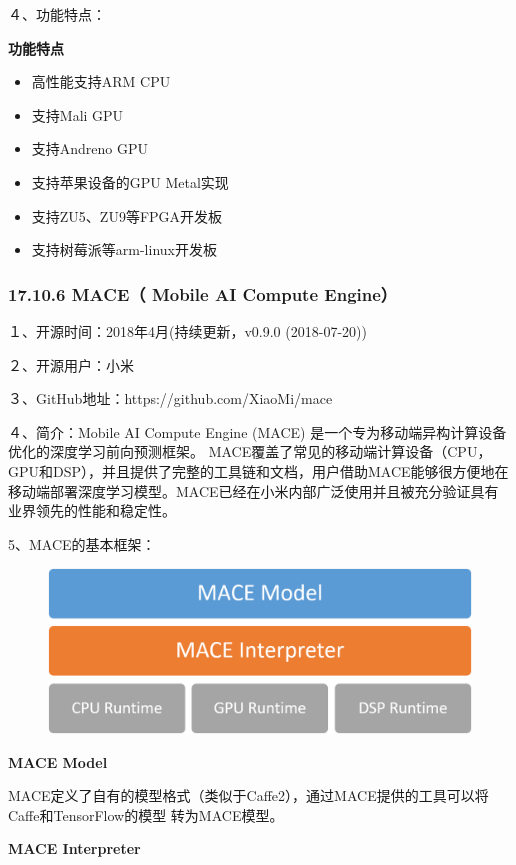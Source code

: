 ４、功能特点：

\textbf{功能特点}

\begin{itemize}
\item
  高性能支持ARM CPU
\item
  支持Mali GPU
\item
  支持Andreno GPU
\item
  支持苹果设备的GPU Metal实现
\item
  支持ZU5、ZU9等FPGA开发板
\item
  支持树莓派等arm-linux开发板
\end{itemize}

\subsubsection{17.10.6 MACE（ Mobile AI Compute
Engine）}\label{mace-mobile-ai-compute-engine}

１、开源时间：2018年4月(持续更新，v0.9.0 (2018-07-20))　　　

２、开源用户：小米　　　　

３、GitHub地址：https://github.com/XiaoMi/mace

４、简介：Mobile AI Compute Engine (MACE)
是一个专为移动端异构计算设备优化的深度学习前向预测框架。
MACE覆盖了常见的移动端计算设备（CPU，GPU和DSP），并且提供了完整的工具链和文档，用户借助MACE能够很方便地在移动端部署深度学习模型。MACE已经在小米内部广泛使用并且被充分验证具有业界领先的性能和稳定性。

5、MACE的基本框架：

\begin{figure}
\centering
\includegraphics{./img/ch17/mace-arch.png}
\caption{}
\end{figure}

\textbf{MACE Model}

MACE定义了自有的模型格式（类似于Caffe2），通过MACE提供的工具可以将Caffe和TensorFlow的模型
转为MACE模型。

\textbf{MACE Interpreter}

